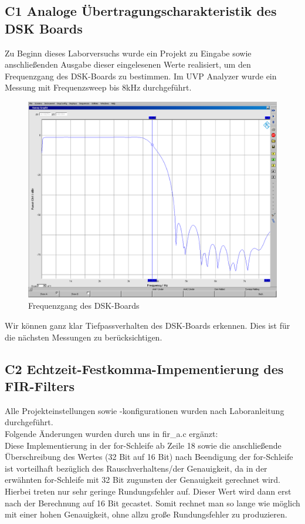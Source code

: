 \clearpage

\subsection{C1 Analoge Übertragungscharakteristik des DSK Boards}
\noindent Zu Beginn dieses Laborversuchs wurde ein Projekt zu Eingabe sowie anschließenden Ausgabe dieser eingelesenen Werte realisiert, um den Frequenzgang des DSK-Boards zu bestimmen. Im UVP Analyzer wurde ein Messung mit Frequenzsweep bis 8kHz durchgeführt.

\begin{figure}[h]
	\centering
	\includegraphics[width=1\linewidth]{Bilder/Attachment_C1_DSK_Frequenzgang}
	\caption{Frequenzgang des DSK-Boards}
	\label{fig:Attachment_C1_DSK_Frequenzgang}
\end{figure}

\noindent Wir können ganz klar Tiefpassverhalten des DSK-Boards erkennen. Dies ist für die nächsten Messungen zu berücksichtigen.

\clearpage

\subsection{C2 Echtzeit-Festkomma-Impementierung des FIR-Filters}
\noindent Alle Projekteinstellungen sowie -konfigurationen wurden nach Laboranleitung durchgeführt.\\
\noindent Folgende Änderungen wurden durch uns in fir\_a.c ergänzt: \\

\noindent Diese Implementierung in der for-Schleife ab Zeile 18 sowie die anschließende Überschreibung des Wertes (32 Bit auf 16 Bit) nach Beendigung der for-Schleife ist vorteilhaft bezüglich des Rauschverhaltens/der Genauigkeit, da in der erwähnten for-Schleife mit 32 Bit zugunsten der Genauigkeit gerechnet wird. Hierbei treten nur sehr geringe Rundungsfehler auf. Dieser Wert wird dann erst nach der Berechnung auf 16 Bit gecastet. Somit rechnet man so lange wie möglich mit einer hohen Genauigkeit, ohne allzu große Rundungsfehler zu produzieren.


